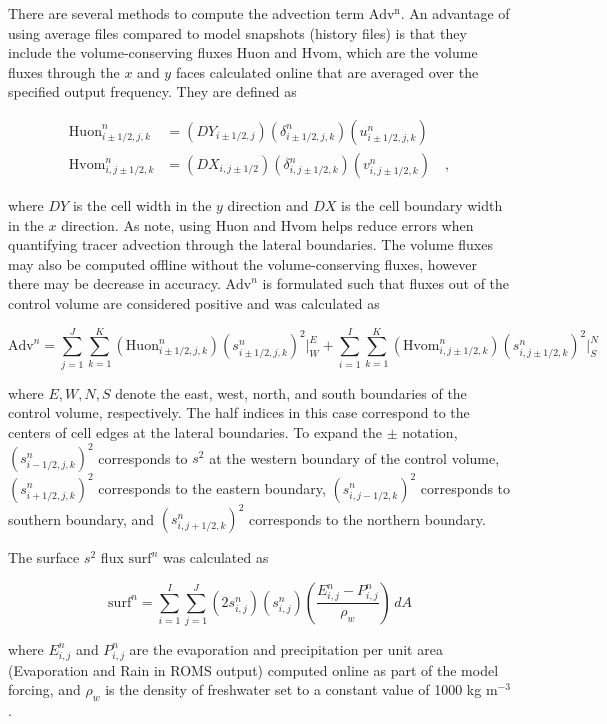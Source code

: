 \documentclass[draft]{agujournal2019}
\begin{document}
There are several methods to compute the advection term $\mathrm{Adv^n}$. An advantage of using average files compared to model snapshots (history files) is that they include the volume-conserving fluxes Huon and Hvom, which are the volume fluxes through the $x$ and $y$ faces calculated online that are averaged over the specified output frequency. They are defined as
\begin{linenomath*}
    \begin{equation}
        \begin{split}
        \mathrm{Huon}_{i \pm 1/2,j,k}^n & = (DY_{i\pm 1/2,j})(\delta_{i\pm 1/2,j,k}^n)(u_{i\pm 1/2,j,k}^n) \\
        \mathrm{Hvom}_{i,j \pm 1/2,k}^n & = (DX_{i,j\pm 1/2})(\delta_{i,j\pm 1/2,k}^n)(v_{i,j\pm 1/2,k}^n) \quad ,
        \end{split}
    \end{equation}
\end{linenomath*}
where $DY$ is the cell width in the $y$ direction and $DX$ is the cell boundary width in the $x$ direction. As  note, using Huon and Hvom helps reduce errors when quantifying tracer advection through the lateral boundaries. The volume fluxes may also be computed offline without the volume-conserving fluxes, however there may be decrease in accuracy. $\mathrm{Adv}^n$ is formulated such that fluxes out of the control volume are considered positive and was calculated as 
\begin{linenomath*}
    \begin{equation} \label{eq:append_adv}
        \mathrm{Adv}^n = \sum_{j=1}^{J}\sum_{k=1}^{K}(\text{Huon}_{i \pm 1/2, j,k}^n)(s_{i \pm 1/2,j,k}^{n})^2 \bigg|_{W}^{E}+\sum_{i=1}^{I}\sum_{k=1}^{K}(\text{Hvom}_{i,j \pm 1/2,k}^n)(s_{i,j \pm 1/2,k}^{n})^2 \bigg|_{S}^{N}
    \end{equation}
\end{linenomath*}
where $E,W,N,S$ denote the east, west, north, and south boundaries of the control volume, respectively. The half indices in this case correspond to the centers of cell edges at the lateral boundaries. To expand the $\pm$ notation, $(s_{i-1/2,j,k}^{n})^2$ corresponds to $s^2$ at the western boundary of the control volume, $(s_{i+1/2,j,k}^{n})^2$ corresponds to the eastern boundary, $(s_{i,j-1/2,k}^{n})^2$ corresponds to southern boundary, and $(s_{i,j+1/2,k}^{n})^2$ corresponds to the northern boundary. 

The surface $s^2$ flux $\mathrm{surf}^n$ was calculated as
\begin{linenomath*}
    \begin{equation} \label{eq:append_surf}
        \mathrm{surf}^n = \sum_{i=1}^{I}\sum_{j=1}^{J}(2s_{i,j}^n)(s_{i,j}^n) \left(\frac{E_{i,j}^n-P_{i,j}^n}{\rho_w} \right) \, dA
    \end{equation}
\end{linenomath*}
where $E_{i,j}^n$ and $P_{i,j}^n$ are the evaporation and precipitation per unit area (Evaporation and Rain in ROMS output) computed online as part of the model forcing, and $\rho_w$ is the density of freshwater set to a constant value of 1000 kg m$^{-3}$. 
\end{document}
